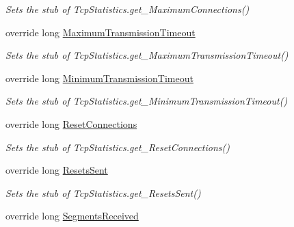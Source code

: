\begin{DoxyCompactItemize}
\begin{DoxyCompactList}\small\item\em Sets the stub of Tcp\-Statistics.\-get\-\_\-\-Maximum\-Connections()\end{DoxyCompactList}\item 
override long \hyperlink{class_system_1_1_net_1_1_network_information_1_1_fakes_1_1_stub_tcp_statistics_a1b4785f48b2449d41d98492aa503149e}{Maximum\-Transmission\-Timeout}
\begin{DoxyCompactList}\small\item\em Sets the stub of Tcp\-Statistics.\-get\-\_\-\-Maximum\-Transmission\-Timeout()\end{DoxyCompactList}\item 
override long \hyperlink{class_system_1_1_net_1_1_network_information_1_1_fakes_1_1_stub_tcp_statistics_a31bbbae6de7cdf842c24d14fe7a9d077}{Minimum\-Transmission\-Timeout}
\begin{DoxyCompactList}\small\item\em Sets the stub of Tcp\-Statistics.\-get\-\_\-\-Minimum\-Transmission\-Timeout()\end{DoxyCompactList}\item 
override long \hyperlink{class_system_1_1_net_1_1_network_information_1_1_fakes_1_1_stub_tcp_statistics_aaad4aa1770f3ca012c1d8d8e87dfe285}{Reset\-Connections}
\begin{DoxyCompactList}\small\item\em Sets the stub of Tcp\-Statistics.\-get\-\_\-\-Reset\-Connections()\end{DoxyCompactList}\item 
override long \hyperlink{class_system_1_1_net_1_1_network_information_1_1_fakes_1_1_stub_tcp_statistics_a8f9fba2907ef42ab01684c9ad8e74ca6}{Resets\-Sent}
\begin{DoxyCompactList}\small\item\em Sets the stub of Tcp\-Statistics.\-get\-\_\-\-Resets\-Sent()\end{DoxyCompactList}\item 
override long \hyperlink{class_system_1_1_net_1_1_network_information_1_1_fakes_1_1_stub_tcp_statistics_a4b1e8267c256c773d48d9bbca73f899c}{Segments\-Received}

\end{DoxyCompactItemize}
